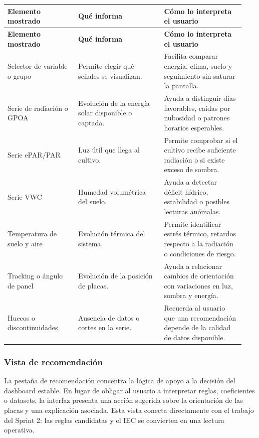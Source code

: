 ﻿\documentclass[11pt,a4paper]{article}
\begin{document}
\begin{longtable}{p{0.28\linewidth}p{0.34\linewidth}p{0.32\linewidth}}
\toprule
\textbf{Elemento mostrado} & \textbf{Qué informa} & \textbf{Cómo lo interpreta el usuario} \\
\midrule
\endfirsthead
\toprule
\textbf{Elemento mostrado} & \textbf{Qué informa} & \textbf{Cómo lo interpreta el usuario} \\
\midrule
\endhead
Selector de variable o grupo & Permite elegir qué señales se visualizan. & Facilita comparar energía, clima, suelo y seguimiento sin saturar la pantalla. \\ \addlinespace
Serie de radiación o GPOA & Evolución de la energía solar disponible o captada. & Ayuda a distinguir días favorables, caídas por nubosidad o patrones horarios esperables. \\ \addlinespace
Serie ePAR/PAR & Luz útil que llega al cultivo. & Permite comprobar si el cultivo recibe suficiente radiación o si existe exceso de sombra. \\ \addlinespace
Serie VWC & Humedad volumétrica del suelo. & Ayuda a detectar déficit hídrico, estabilidad o posibles lecturas anómalas. \\ \addlinespace
Temperatura de suelo y aire & Evolución térmica del sistema. & Permite identificar estrés térmico, retardos respecto a la radiación o condiciones de riesgo. \\ \addlinespace
Tracking o ángulo de panel & Evolución de la posición de placas. & Ayuda a relacionar cambios de orientación con variaciones en luz, sombra y energía. \\ \addlinespace
Huecos o discontinuidades & Ausencia de datos o cortes en la serie. & Recuerda al usuario que una recomendación depende de la calidad de datos disponible. \\
\bottomrule
\end{longtable}

\subsubsection{Vista de recomendación}

La pestaña de recomendación concentra la lógica de apoyo a la decisión del dashboard estable. En lugar de obligar al usuario a interpretar reglas, coeficientes o datasets, la interfaz presenta una acción sugerida sobre la orientación de las placas y una explicación asociada. Esta vista conecta directamente con el trabajo del Sprint 2: las reglas candidatas y el IEC se convierten en una lectura operativa.
\end{document}
